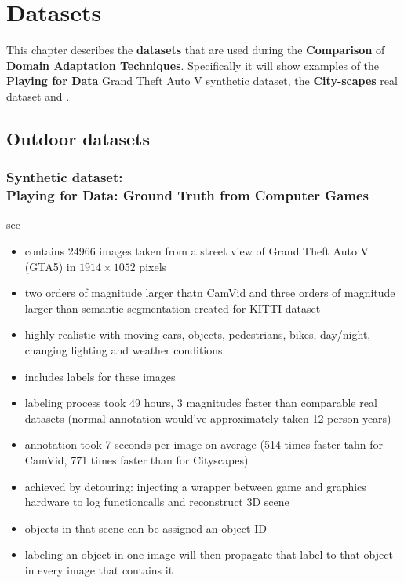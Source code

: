 \chapter{Datasets}
\label{sec:datasets}

This chapter describes the \textbf{datasets} that are used during the \textbf{Comparison} of \textbf{Domain Adaptation Techniques}. Specifically it will show examples of the \textbf{Playing for Data} Grand Theft Auto V synthetic dataset, the \textbf{City-scapes} real dataset and .


\section{Outdoor datasets}

\subsection{Synthetic dataset: \\
	Playing for Data: Ground Truth from Computer Games}
see \cite{Richter_2016_ECCV}

\begin{itemize}
	\item contains 24966 images taken from a street view of Grand Theft Auto V (GTA5) in $1914 \times 1052$ pixels
	\item two orders of magnitude larger thatn CamVid and three orders of magnitude larger than semantic segmentation created for KITTI dataset
	\item highly realistic with moving cars, objects, pedestrians, bikes, day/night, changing lighting and weather conditions
	\item includes labels for these images
	\item labeling process took 49 hours, 3 magnitudes faster than comparable real datasets (normal annotation would've approximately taken 12 person-years)
	\item annotation took 7 seconds per image on average (514 times faster tahn for CamVid, 771 times faster than for Cityscapes)
	\item achieved by detouring: injecting a wrapper between game and graphics hardware to log functioncalls and reconstruct 3D scene
	\item objects in that scene can be assigned an object ID
	\item labeling an object in one image will then propagate that label to that object in every image that contains it
\end{itemize}

